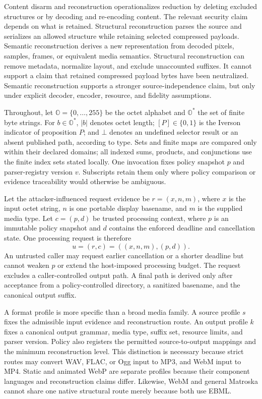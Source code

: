 Content disarm and reconstruction operationalizes reduction by deleting excluded
structures or by decoding and re-encoding content. The relevant security claim
depends on what is retained. Structural reconstruction parses the source and
serializes an allowed structure while retaining selected compressed payloads.
Semantic reconstruction derives a new representation from decoded pixels,
samples, frames, or equivalent media semantics. Structural reconstruction can
remove metadata, normalize layout, and exclude unaccounted suffixes. It cannot
support a claim that retained compressed payload bytes have been neutralized.
Semantic reconstruction supports a stronger source-independence claim, but only
under explicit decoder, encoder, resource, and fidelity assumptions.

Throughout, let \(\mathbb O=\{0,\ldots,255\}\) be the octet alphabet and
\(\mathbb O^*\) the set of finite byte strings. For \(b\in\mathbb O^*\),
\(|b|\) denotes octet length; \([P]\in\{0,1\}\) is the Iverson indicator of
proposition \(P\); and \(\bot\) denotes an undefined selector result or an
absent published path, according to type. Sets and finite maps are compared only
within their declared domains; all indexed sums, products, and conjunctions use
the finite index sets stated locally. One invocation fixes policy snapshot
\(p\) and parser-registry version \(v\). Subscripts retain them only where
policy comparison or evidence traceability would otherwise be ambiguous.

Let the attacker-influenced request evidence be \(r=(x,n,m)\), where \(x\) is
the input octet string, \(n\) is one portable display basename, and \(m\) is
the supplied media type. Let \(c=(p,d)\) be trusted processing context, where
\(p\) is an immutable policy snapshot and \(d\) contains the enforced deadline
and cancellation state. One processing request is therefore
\begin{equation}
  u=(r,c)=((x,n,m),(p,d)).
  \label{eq:processing-unit}
\end{equation}
An untrusted caller may request earlier cancellation or a shorter deadline but
cannot weaken \(p\) or extend the host-imposed processing budget. The request
excludes a caller-controlled output path. A final path is derived only after
acceptance from a policy-controlled directory, a sanitized basename, and the
canonical output suffix.

A format profile is more specific than a broad media family. A source profile
\(s\) fixes the admissible input evidence and reconstruction route. An output
profile \(k\) fixes a canonical output grammar, media type, suffix set, resource
limits, and parser version. Policy also registers the permitted
source-to-output mappings and the minimum reconstruction level. This distinction
is necessary because strict routes may convert WAV, FLAC, or Ogg input to MP3,
and WebM input to MP4. Static and animated WebP are separate profiles because
their component languages and reconstruction claims differ. Likewise, WebM and
general Matroska cannot share one native structural route merely because both
use EBML.

